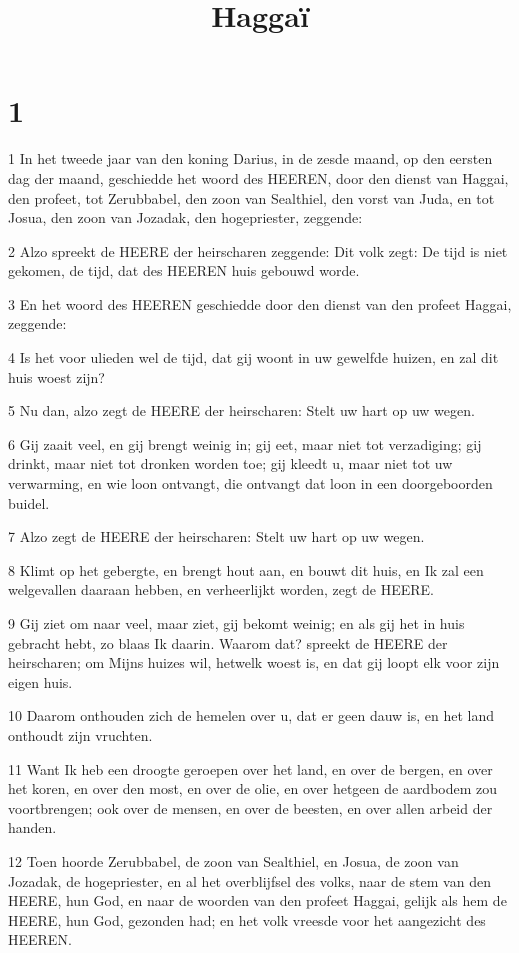 

\title{Haggaï}



\chapter{1}

\par 1 In het tweede jaar van den koning Darius, in de zesde maand, op den eersten dag der maand, geschiedde het woord des HEEREN, door den dienst van Haggai, den profeet, tot Zerubbabel, den zoon van Sealthiel, den vorst van Juda, en tot Josua, den zoon van Jozadak, den hogepriester, zeggende:
\par 2 Alzo spreekt de HEERE der heirscharen zeggende: Dit volk zegt: De tijd is niet gekomen, de tijd, dat des HEEREN huis gebouwd worde.
\par 3 En het woord des HEEREN geschiedde door den dienst van den profeet Haggai, zeggende:
\par 4 Is het voor ulieden wel de tijd, dat gij woont in uw gewelfde huizen, en zal dit huis woest zijn?
\par 5 Nu dan, alzo zegt de HEERE der heirscharen: Stelt uw hart op uw wegen.
\par 6 Gij zaait veel, en gij brengt weinig in; gij eet, maar niet tot verzadiging; gij drinkt, maar niet tot dronken worden toe; gij kleedt u, maar niet tot uw verwarming, en wie loon ontvangt, die ontvangt dat loon in een doorgeboorden buidel.
\par 7 Alzo zegt de HEERE der heirscharen: Stelt uw hart op uw wegen.
\par 8 Klimt op het gebergte, en brengt hout aan, en bouwt dit huis, en Ik zal een welgevallen daaraan hebben, en verheerlijkt worden, zegt de HEERE.
\par 9 Gij ziet om naar veel, maar ziet, gij bekomt weinig; en als gij het in huis gebracht hebt, zo blaas Ik daarin. Waarom dat? spreekt de HEERE der heirscharen; om Mijns huizes wil, hetwelk woest is, en dat gij loopt elk voor zijn eigen huis.
\par 10 Daarom onthouden zich de hemelen over u, dat er geen dauw is, en het land onthoudt zijn vruchten.
\par 11 Want Ik heb een droogte geroepen over het land, en over de bergen, en over het koren, en over den most, en over de olie, en over hetgeen de aardbodem zou voortbrengen; ook over de mensen, en over de beesten, en over allen arbeid der handen.
\par 12 Toen hoorde Zerubbabel, de zoon van Sealthiel, en Josua, de zoon van Jozadak, de hogepriester, en al het overblijfsel des volks, naar de stem van den HEERE, hun God, en naar de woorden van den profeet Haggai, gelijk als hem de HEERE, hun God, gezonden had; en het volk vreesde voor het aangezicht des HEEREN.
